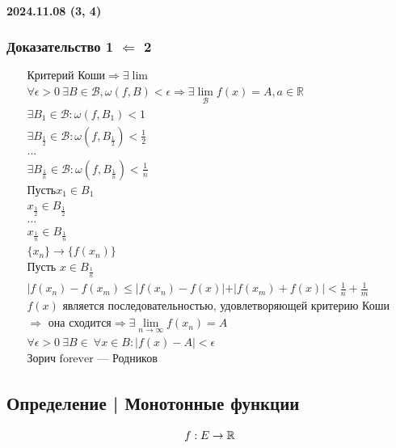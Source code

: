 \documentclass{article}
\begin{document}
\paragraph{2024.11.08 (3, 4)}
\subsubsection{Доказательство 1 $\Leftarrow$ 2}
\begin{gather*}
    \text{Критерий Коши} \Rightarrow \exists \lim \\
    \forall \epsilon > 0 ~ \exists B \in \mathcal{B}, \omega(f, B) < \epsilon \Rightarrow
    \exists \lim_{\mathcal{B}} f(x) = A, a \in \mathbb{R} \\
    \exists B_1 \in \mathcal{B}: \omega(f, B_1) < 1 \\
    \exists B_\frac{1}{2} \in \mathcal{B}: \omega(f, B_{\frac{1}{2}}) < \frac{1}{2} \\
    \dots \\
    \exists B_\frac{1}{n} \in \mathcal{B}: \omega(f, B_{\frac{1}{n}}) < \frac{1}{n} \\
    \text{Пусть} x_1 \in B_1 \\
    x_{\frac{1}{2}} \in B_{\frac{1}{2}} \\
    \dots \\
    x_{\frac{1}{n}} \in B_{\frac{1}{n}} \\
    \{x_n\} \rightarrow \{f(x_n)\} \\
    \text{Пусть } x \in B_{\frac{1}{n}} \\
    |f(x_n) - f(x_m) \le |f(x_n) - f(x)| + |f(x_m) + f(x)| < \frac{1}{n} + \frac{1}{m} \\
    f(x) \text{ является последовательностью, удовлетворяющей критерию Коши } \\
    \Rightarrow \text{ она сходится} \Rightarrow
    \exists \lim_{n \to \infty} f(x_n) = A \\
    \forall \epsilon > 0 ~ \exists B \in \mathcal ~ \forall x \in B: |f(x) - A| < \epsilon \\
    \text{Зорич forever --- Родников}
\end{gather*}



\subsection{Определение | Монотонные функции}
\[
    f: E \rightarrow \mathbb{R} \\
\]
\end{document}
